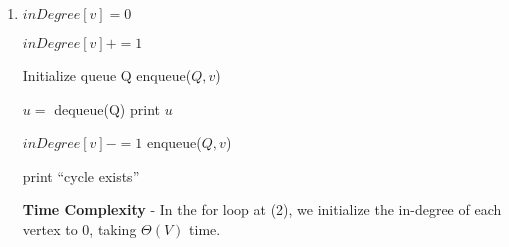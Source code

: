 \documentclass[a4paper]{report}
\begin{document}
\begin{enumerate}
    {\bf Time Complexity:}
    Case 1: If the algorithm discovers that the graph is acyclic (no back edges), there are at most $|V| - 1$ edges.
    Together with DFS' time complexity of $\Theta(|V| + |E|)$, this case's time complexity is $\Theta(V)$. 

    Case 2: If the algorithm discovers that the graph is cyclic, it has found a back edge. The algorithm stops before 
    checking at most $|V|$ edges. 
    Together with DFS' time complexity of $\Theta(|V| + |E|)$, this case's time complexity is $O(V)$. 

    Therefore, the algorithm's time complexity is $O(V)$ because $O$ in Case 2 is less strict than $\Theta$ in Case 1. 

    -----

    \pagebreak
    \par
    \bigskip

    Pseudocode for Topological Sort:

    \item
      \begin{algorithmic}[1]
          \State $inDegree[v]=0$
        \EndFor

            \State $inDegree[v]+=1$
          \EndFor
        \EndFor

        \State Initialize queue Q
            \State enqueue($Q,v$)
          \EndIf
        \EndFor


          \State $u =$ dequeue(Q)
          \State print $u$

            \State $inDegree[v] -= 1$
              \State enqueue($Q,v$)
            \EndIf
          \EndFor
        \EndWhile

            \State print ``cycle exists''
          \EndIf
        \EndFor
      \EndFunction
      \end{algorithmic}

      {\bf Time Complexity}
      - In the for loop at (2), we initialize the in-degree of each vertex to 0, taking $\Theta(V)$ time. 


\end{enumerate}
\end{document}
